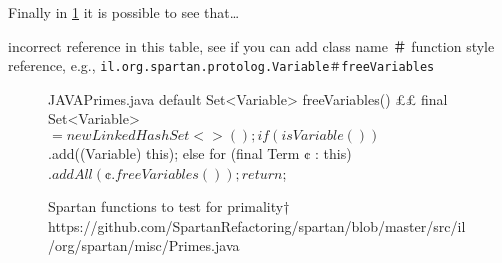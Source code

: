 Finally in \cref{figure:shock-3} it is possible to see that…

\matteo incorrect reference in this table, see if you can add class name
＃ function style reference,
e.g., \texttt{il.org.spartan.protolog.Variable＃freeVariables}

\begin{figure}[ht]
    \caption{%
      Spartan functions to test for primality†{%
        https://github.com/SpartanRefactoring/spartan/blob/master/src/il/org/spartan/misc/Primes.java
      }
    }
\label{figure:shock-3}
\begin{Code}{JAVA}{Primes.java}
default Set<Variable> freeVariables() {££
    final Set<Variable> $ = new LinkedHashSet<>();
    if (isVariable())
     $.add((Variable) this);
    else
      for (final Term ¢ : this)
       $.addAll(¢.freeVariables());
    return $;
  }
\end{Code}
\end{figure}
